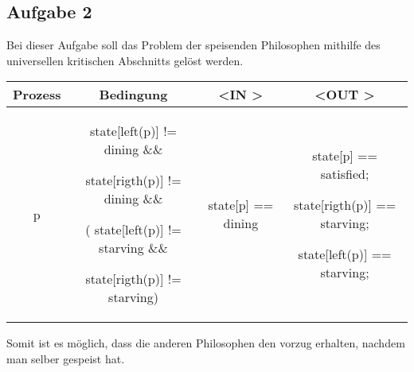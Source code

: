 \subsection*{Aufgabe 2}


Bei dieser Aufgabe soll das Problem der speisenden Philosophen mithilfe des universellen kritischen Abschnitts gelöst werden. 
\\

\begin{tabular}{ c | c | c | c }
	Prozess  & Bedingung &  \textless IN \textgreater & \textless OUT \textgreater \\
	\hline
	p		&   
	\parbox[t]{3in}{
		state[left(p)] != dining \&\& 
		\par state[rigth(p)]  != dining \&\&  
		\par ( state[left(p)] != starving \&\& 
		\par state[rigth(p)] != starving)
		\strut
	}  & 
	state[p] == dining		&	
	\parbox[t]{3in}{
		state[p] == satisfied; 
		\par state[rigth(p)]  == starving;  
		\par state[left(p)]  == starving;  
		\strut
	}\\

\end{tabular}


Somit ist es möglich, dass die anderen Philosophen den vorzug erhalten, nachdem man selber gespeist hat.